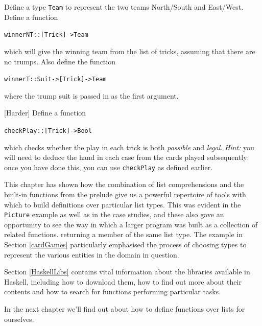 \begin{exercises}

\item
Define a type \texttt{Team} to represent the two teams North/South and East/West. Define a function 
\begin{alltt}
winnerNT :: [Trick] -> Team
\end{alltt} 
which will give the winning team from the list of tricks, assuming that there are no trumps. Also define the function
\begin{alltt}
winnerT :: Suit -> [Trick] -> Team
\end{alltt} 
where the trump suit is passed in as the first argument.

\item {[Harder]}
Define a function 
\begin{alltt}
checkPlay :: [Trick] -> Bool
\end{alltt}
which checks whether the play in each trick is both \emph{possible} and \emph{legal}.
\emph{Hint:} you will need to deduce the hand in each case from the cards played subsequently: once you have done this, you can use \texttt{checkPlay} as defined earlier.

\end{exercises}

 
\begin{summary}

This chapter has shown how the combination of list comprehensions and the built-in
functions from the prelude give us a powerful repertoire of tools with
which to build definitions over particular list types. This was evident
in the \texttt{Picture} example as well as in the case studies, and
these also gave an opportunity to see the way in which a larger program
was built as a collection of related functions.
returning a member of the same list type. The example in Section \ref{cardGames} particularly emphasised the process of choosing types to represent the various entities in the domain in question.

Section \ref{HaskellLibs} contains vital information about the libraries available in Haskell, including how to download them, how to find out more about their contents and how to search for functions performing particular tasks. 

In the next chapter we'll find out about how to define functions over lists for ourselves.
\end{summary}

%
